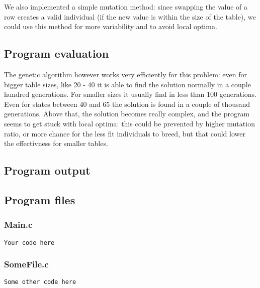 \documentclass{article}
\begin{document}
We also implemented a simple mutation method: since swapping the value of a row creates a valid individual (if the new value is within the size of the table), we could use this method for more variability and to avoid local optima.


\subsection*{Program evaluation}
The genetic algorithm however works very efficiently for this problem: even for bigger table sizes, like 20 - 40 it is able to find the solution normally in a couple hundred generations. For smaller sizes it usually find in less than 100 generations. Even for states between 40 and 65 the solution is found in a couple of thousand generations. Above that, the solution becomes really complex, and the program seems to get stuck with local optima: this could be prevented by higher mutation ratio, or more chance for the less fit individuals to breed, but that could lower the effectivness for smaller tables.

\subsection*{Program output}


\subsection*{Program files}
\subsubsection*{Main.c}
\begin{lstlisting}
Your code here
\end{lstlisting}

\subsubsection*{SomeFile.c}
\begin{lstlisting}
Some other code here
\end{lstlisting}
\end{document}
